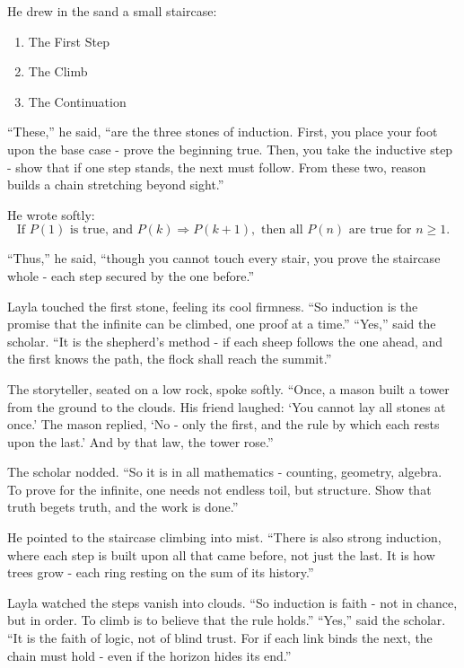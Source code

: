 \documentclass[
  letterpaper,
  DIV=11,
  numbers=noendperiod]{scrreprt}
\providecommand{\tightlist}{%
  \setlength{\itemsep}{0pt}\setlength{\parskip}{0pt}}
\begin{document}
He drew in the sand a small staircase:

\begin{enumerate}
\def\labelenumi{\arabic{enumi}.}
\tightlist
\item
  The First Step
\item
  The Climb
\item
  The Continuation
\end{enumerate}

``These,'' he said, ``are the three stones of induction. First, you
place your foot upon the base case - prove the beginning true. Then, you
take the inductive step - show that if one step stands, the next must
follow. From these two, reason builds a chain stretching beyond sight.''

He wrote softly: \[
\text{If } P(1) \text{ is true, and } P(k) \Rightarrow P(k+1), \text{ then all } P(n) \text{ are true for } n \geq 1.
\]

``Thus,'' he said, ``though you cannot touch every stair, you prove the
staircase whole - each step secured by the one before.''

Layla touched the first stone, feeling its cool firmness. ``So induction
is the promise that the infinite can be climbed, one proof at a time.''
``Yes,'' said the scholar. ``It is the shepherd's method - if each sheep
follows the one ahead, and the first knows the path, the flock shall
reach the summit.''

The storyteller, seated on a low rock, spoke softly. ``Once, a mason
built a tower from the ground to the clouds. His friend laughed: `You
cannot lay all stones at once.' The mason replied, `No - only the first,
and the rule by which each rests upon the last.' And by that law, the
tower rose.''

The scholar nodded. ``So it is in all mathematics - counting, geometry,
algebra. To prove for the infinite, one needs not endless toil, but
structure. Show that truth begets truth, and the work is done.''

He pointed to the staircase climbing into mist. ``There is also strong
induction, where each step is built upon all that came before, not just
the last. It is how trees grow - each ring resting on the sum of its
history.''

Layla watched the steps vanish into clouds. ``So induction is faith -
not in chance, but in order. To climb is to believe that the rule
holds.'' ``Yes,'' said the scholar. ``It is the faith of logic, not of
blind trust. For if each link binds the next, the chain must hold - even
if the horizon hides its end.''
\end{document}
